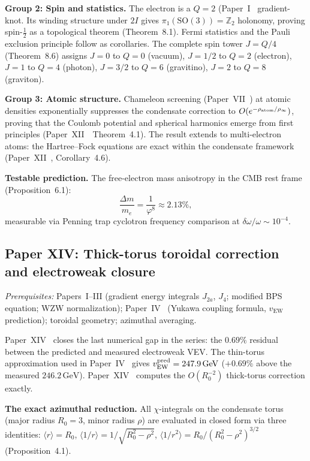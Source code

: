 \documentclass[11pt,a4paper]{article}
\newcommand{\vp}{\varphi}
\newcommand{\ZZ}{\mathbb{Z}}
\newcommand{\twoI}{2I}
\newcommand{\vEW}{v_{\mathrm{EW}}}
\begin{document}
\textbf{Group 2: Spin and statistics.}
The electron is a $Q=2$ (Paper~I~\cite{Paper1} gradient-knot. Its winding structure
under $\twoI$ gives $\pi_1(\mathrm{SO}(3)) = \ZZ_2$ holonomy, proving
spin-$\tfrac{1}{2}$ as a topological theorem (Theorem~8.1).
Fermi statistics and the Pauli exclusion principle follow as corollaries.
The complete spin tower $J = Q/4$ (Theorem~8.6) assigns
$J=0$ to $Q=0$ (vacuum), $J=1/2$ to $Q=2$ (electron), $J=1$ to $Q=4$ (photon),
$J=3/2$ to $Q=6$ (gravitino), $J=2$ to $Q=8$ (graviton).

\textbf{Group 3: Atomic structure.}
Chameleon screening (Paper~VII~\cite{Paper7}) at atomic densities exponentially suppresses
the condensate correction to $O(e^{-\rho_{\rm atom}/\rho_\infty})$, proving
that the Coulomb potential and spherical harmonics emerge from first principles
(Paper~XII~\cite{Paper13}~Theorem~4.1). The result extends to
multi-electron atoms: the Hartree--Fock equations are exact within the
condensate framework (Paper~XII~\cite{Paper13}, Corollary~4.6).

\textbf{Testable prediction.}
The free-electron mass anisotropy in the CMB rest frame
(Proposition~6.1):
\begin{equation}
  \frac{\Delta m}{m_e} = \frac{1}{\vp^8} \approx 2.13\%,
\end{equation}
measurable via Penning trap cyclotron frequency comparison at
$\delta\omega/\omega \sim 10^{-4}$.

\subsection{Paper XIV: Thick-torus toroidal correction and electroweak closure}

\textit{Prerequisites:} Papers~I--III (gradient energy integrals $J_{2a}$,
$J_4$; modified BPS equation; WZW normalization);
Paper~IV~\cite{Paper4} (Yukawa coupling formula, $\vEW$ prediction);
toroidal geometry; azimuthal averaging.

Paper~XIV~\cite{Paper14} closes the last numerical gap in the series: the $0.69\%$
residual between the predicted and measured electroweak VEV.
The thin-torus approximation used in Paper~IV~\cite{Paper4} gives
$\vEW^{\rm pred} = 247.9\,\mathrm{GeV}$ ($+0.69\%$ above the measured
$246.2\,\mathrm{GeV}$). Paper~XIV~\cite{Paper14} computes the $O(R_0^{-2})$ thick-torus
correction exactly.

\textbf{The exact azimuthal reduction.}
All $\chi$-integrals on the condensate torus (major radius $R_0=3$,
minor radius $\rho$) are evaluated in closed form via three identities:
$\langle r\rangle = R_0$, $\langle 1/r\rangle = 1/\sqrt{R_0^2-\rho^2}$,
$\langle 1/r^2\rangle = R_0/(R_0^2-\rho^2)^{3/2}$ (Proposition~4.1).
\end{document}
